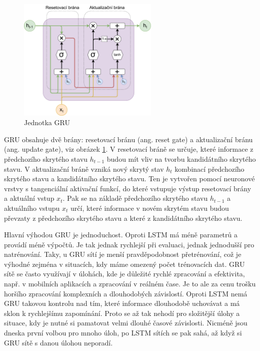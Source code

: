 \begin{figure}
    \centering
    \includegraphics[width=0.6\textwidth]{Figures/GRU_unit.pdf}
    \caption{Jednotka GRU}
    \label{fig:gru_unit}
\end{figure}

GRU obsahuje dvě brány: resetovací bránu (ang. reset gate) a aktualizační bránu
(ang. update gate), viz obrázek \ref{fig:gru_unit}. V resetovací bráně se
určuje, které informace z předchozího skrytého stavu $h_{t-1}$ budou mít vliv
na tvorbu kandidátního skrytého stavu. V aktualizační bráně vzniká nový skrytý
stav $h_t$ kombinací předchozího skrytého stavu a kandidátního skrytého stavu.
Ten je vytvořen pomocí neuronové vrstvy s tangenciální aktivační funkcí, do
které vstupuje výstup resetovací brány a aktuální vstup $x_t$. Pak se na
základě předchozího skrytého stavu $h_{t-1}$ a aktuálního vstupu $x_t$ určí,
které informace v novém skrytém stavu budou převzaty z předchozího skrytého
stavu a které z kandidátního skrytého stavu.

Hlavní výhodou GRU je jednoduchost. Oproti LSTM má méně parametrů a provádí
méně výpočtů. Je tak jednak rychlejší při evaluaci, jednak jednodušší pro
natrénování. Taky, u GRU sítí je menší pravděpodobnost přetrénování, což je
výhodné zejména v situacích, kdy máme omezený počet trénovacích dat. GRU sítě
se často využívají v úlohách, kde je důležité rychlé zpracování a efektivita,
např. v mobilních aplikacích a zpracování v reálném čase. Je to ale za cenu
trošku horšího zpracování komplexních a dlouhodobých závislostí. Oproti LSTM
nemá GRU takovou kontrolu nad tím, které informace dlouhodobě uchovávat a má
sklon k rychlejšímu zapomínání. Proto se až tak nehodí pro složitější úlohy a
situace, kdy je nutné si pamatovat velmi dlouhé časové závislosti. Nicméně jsou
dneska první volbou pro mnoho úloh, po LSTM sítích se pak sahá, až když si GRU
sítě s danou úlohou neporadí.

\endinput